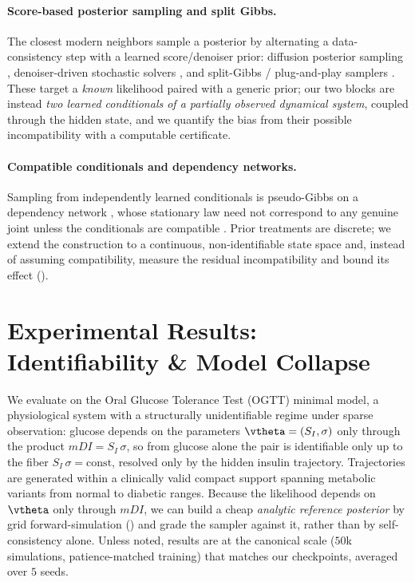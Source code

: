 \documentclass{article} %
\begin{document}
\paragraph{Score-based posterior sampling and split Gibbs.}
The closest modern neighbors sample a posterior by alternating a data-consistency step with a learned score/denoiser prior: diffusion posterior sampling \citep{chung2023diffusion}, denoiser-driven stochastic solvers \citep{kadkhodaie2021stochastic}, and split-Gibbs / plug-and-play samplers \citep{vono2019split, coeurdoux2024plug}. These target a \emph{known} likelihood paired with a generic prior; our two blocks are instead \emph{two learned conditionals of a partially observed dynamical system}, coupled through the hidden state, and we quantify the bias from their possible incompatibility with a computable certificate.

\paragraph{Compatible conditionals and dependency networks.}
Sampling from independently learned conditionals is pseudo-Gibbs on a dependency network \citep{heckerman2000dependency}, whose stationary law need not correspond to any genuine joint unless the conditionals are compatible \citep{arnold2001conditionally}. Prior treatments are discrete; we extend the construction to a continuous, non-identifiable state space and, instead of assuming compatibility, measure the residual incompatibility and bound its effect ().






\section{Experimental Results: Identifiability \& Model Collapse}
\label{sec:experiments}

We evaluate on the Oral Glucose Tolerance Test (OGTT) minimal model, a physiological system with a structurally unidentifiable regime under sparse observation: glucose depends on the parameters $\vtheta=(S_I,\sigma)$ only through the product $mDI = S_I\,\sigma$, so from glucose alone the pair is identifiable only up to the fiber $S_I\,\sigma = \text{const}$, resolved only by the hidden insulin trajectory. Trajectories are generated within a clinically valid compact support spanning metabolic variants from normal to diabetic ranges. Because the likelihood depends on $\vtheta$ only through $mDI$, we can build a cheap \emph{analytic reference posterior} by grid forward-simulation () and grade the sampler against it, rather than by self-consistency alone. Unless noted, results are at the canonical scale ($50$k simulations, patience-matched training) that matches our checkpoints, averaged over $5$ seeds.
\end{document}
